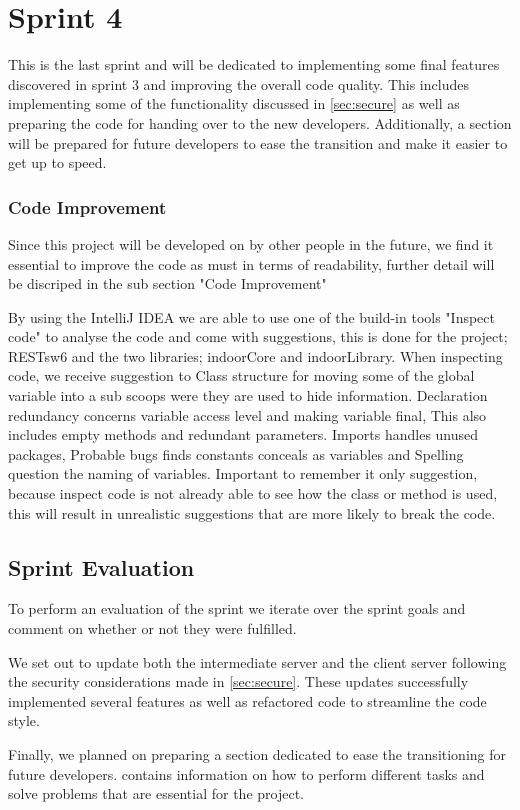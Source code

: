 \chapter{Sprint 4}
This is the last sprint and will be dedicated to implementing some final features discovered in sprint 3 and improving the overall code quality. This includes implementing some of the functionality discussed in \cref{sec:secure} as well as preparing the code for handing over to the new developers. Additionally, a section will be prepared for future developers to ease the transition and make it easier to get up to speed.

\subsection*{Code Improvement}
Since this project will be developed on by other people in the future, we find it essential to improve the code as must in terms of readability, further detail will be discriped in the sub section "Code Improvement"

By using the IntelliJ IDEA we are able to use one of the build-in tools "Inspect code" to analyse the code and come with suggestions, this is done for the project; RESTsw6 and the two libraries; indoorCore and indoorLibrary. When inspecting code, we receive suggestion to Class structure for moving some of the global variable into a sub scoops were they are used to hide information. Declaration redundancy concerns variable access level and making variable final, This also includes empty methods and redundant parameters. Imports handles unused packages, Probable bugs finds constants conceals as variables and Spelling question the naming of variables. Important to remember it only suggestion, because inspect code is not already able to see how the class or method is used, this will result in unrealistic suggestions that are more likely to break the code.






\section{Sprint Evaluation}
To perform an evaluation of the sprint we iterate over the sprint goals and comment on whether or not they were fulfilled.

We set out to update both the intermediate server and the client server following the security considerations made in \cref{sec:secure}. These updates successfully implemented several features as well as refactored code to streamline the code style.

Finally, we planned on preparing a section dedicated to ease the transitioning for future developers.  contains information on how to perform different tasks and solve problems that are essential for the project.